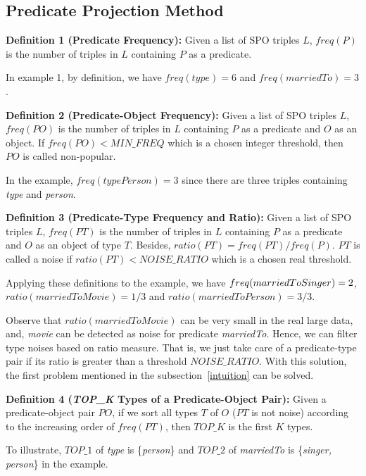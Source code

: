 \documentclass{acm_proc_article-sp}
\begin{document}
\subsection{Predicate Projection Method\\}

\textbf{Definition 1 (Predicate Frequency):} Given a list of SPO triples $L$, $freq(P)$ is the number of triples in $L$ containing $P$ as a predicate.

In example 1, by definition, we have $freq(type) = 6$ and $freq(marriedTo) = 3$.

\textbf{Definition 2 (Predicate-Object Frequency):} Given a list of SPO triples $L$, $freq(PO)$ is the number of triples in $L$ containing $P$ as a predicate and $O$ as an object. If $freq(PO) < MIN\_FREQ$ which is a chosen integer threshold, then $PO$ is called non-popular.

In the example, $freq(typePerson) = 3$ since there are three triples containing \textit{type} and \textit{person}.

\textbf{Definition 3 (Predicate-Type Frequency and Ratio):} Given a list of SPO triples $L$, $freq(PT)$ is the number of triples in $L$ containing $P$ as a predicate and $O$ as an object of type $T$. Besides, $ratio(PT) = freq(PT) / freq(P)$. $PT$ is called a noise if $ratio(PT) < NOISE\_RATIO$ which is a chosen real threshold.

Applying these definitions to the example, we have $freq\\(marriedToSinger) = 2$, $ratio(marriedToMovie) = 1 / 3$ and $ratio(marriedToPerson) = 3 / 3$.

Observe that $ratio(marriedToMovie)$ can be very small in the real large data, and, \textit{movie} can be detected as noise for predicate \textit{marriedTo}. Hence, we can filter type noises based on ratio measure. That is, we just take care of a predicate-type pair if its ratio is greater than a threshold $NOISE\_RATIO$. With this solution, the first problem mentioned in the subsection~\ref{intuition} can be solved.

\textbf{Definition 4 (\textit{TOP\_K} Types of a Predicate-Object Pair):} Given a predicate-object pair $PO$, if we sort all types $T$ of $O$ ($PT$ is not noise) according to the increasing order of $freq(PT)$, then $TOP\_K$ is the first $K$ types.

To illustrate, $TOP\_1$ of \textit{type} is \{\textit{person}\} and $TOP\_2$ of \textit{marriedTo} is \{\textit{singer, person}\} in the example.
\end{document}
